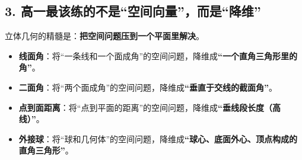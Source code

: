 \documentclass[11pt,a4paper]{ctexart}
\begin{document}
\subsection{3. 高一最该练的不是“空间向量”，而是“降维”}
立体几何的精髓是：\textbf{把空间问题压到一个平面里解决}。
\begin{itemize}
  \item \textbf{线面角}：将“一条线和一个面成角”的空间问题，降维成\textbf{“一个直角三角形里的角”}。
  \item \textbf{二面角}：将“两个面成角”的空间问题，降维成\textbf{“垂直于交线的截面角”}。
  \item \textbf{点到面距离}：将“点到平面的距离”的空间问题，降维成\textbf{“垂线段长度（高线）”}。
  \item \textbf{外接球}：将“球和几何体”的空间问题，降维成\textbf{“球心、底面外心、顶点构成的直角三角形”}。
\end{itemize}
\end{document}
